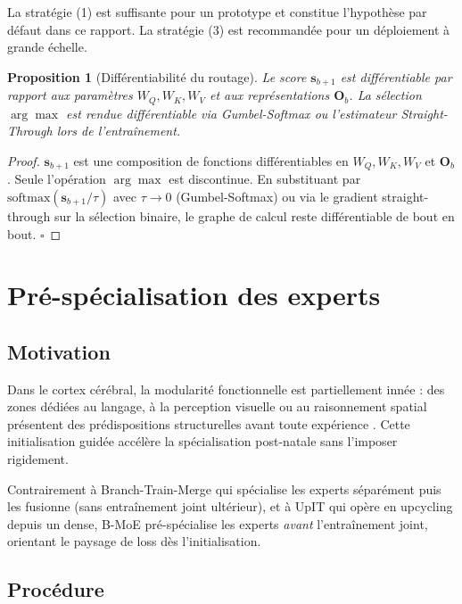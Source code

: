 \documentclass[10pt,a4paper]{article}
\newtheorem{proposition}[theorem]{Proposition}
\begin{document}
La stratégie (1) est suffisante pour un prototype et constitue l'hypothèse par défaut dans ce rapport. La stratégie (3) est recommandée pour un déploiement à grande échelle.

\begin{proposition}[Différentiabilité du routage]
Le score $\mathbf{s}_{b+1}$ est différentiable par rapport aux paramètres $W_Q, W_K, W_V$ et aux représentations $\mathbf{O}_b$. La sélection $\arg\max$ est rendue différentiable via Gumbel-Softmax \cite{jang2017categorical} ou l'estimateur Straight-Through \cite{bengio2013estimating} lors de l'entraînement.
\end{proposition}

\begin{proof}
$\mathbf{s}_{b+1}$ est une composition de fonctions différentiables en $W_Q, W_K, W_V$ et $\mathbf{O}_b$. Seule l'opération $\arg\max$ est discontinue. En substituant par $\mathrm{softmax}(\mathbf{s}_{b+1}/\tau)$ avec $\tau \to 0$ (Gumbel-Softmax) ou via le gradient straight-through sur la sélection binaire, le graphe de calcul reste différentiable de bout en bout. $\square$
\end{proof}

\section{Pré-spécialisation des experts}

\subsection{Motivation}

Dans le cortex cérébral, la modularité fonctionnelle est partiellement innée : des zones dédiées au langage, à la perception visuelle ou au raisonnement spatial présentent des prédispositions structurelles avant toute expérience \cite{dehaene2005neural}. Cette initialisation guidée accélère la spécialisation post-natale sans l'imposer rigidement.

Contrairement à Branch-Train-Merge \cite{li2022btm} qui spécialise les experts séparément puis les fusionne (sans entraînement joint ultérieur), et à UpIT \cite{upit2025} qui opère en upcycling depuis un dense, B-MoE pré-spécialise les experts \textit{avant} l'entraînement joint, orientant le paysage de loss dès l'initialisation.

\subsection{Procédure}
\end{document}
